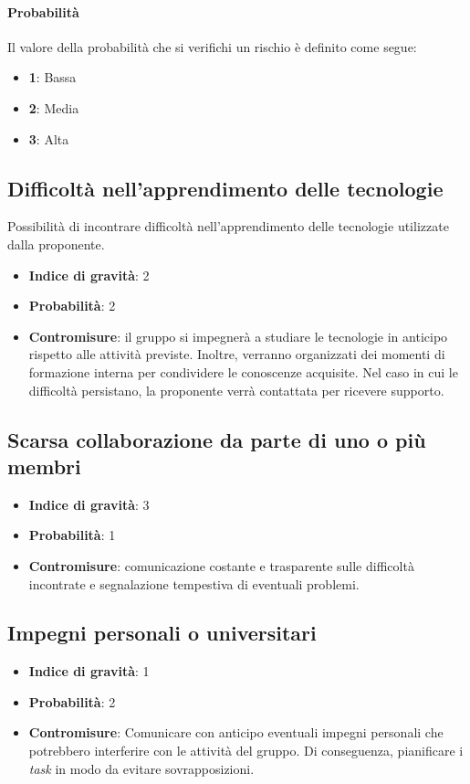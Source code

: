 \documentclass[italian,12pt]{article} %
\begin{document}
\paragraph{Probabilità} Il valore della probabilità che si verifichi un rischio è definito come segue:
\begin{itemize}
	\itemsep0em
	\item \textbf{1}: Bassa
	\item \textbf{2}: Media
	\item \textbf{3}: Alta
\end{itemize}

\subsection{Difficoltà nell'apprendimento delle tecnologie}
Possibilità di incontrare difficoltà nell'apprendimento delle tecnologie utilizzate dalla proponente.
\begin{itemize}
	\item \textbf{Indice di gravità}: 2
	\item \textbf{Probabilità}: 2
	\item \textbf{Contromisure}: il gruppo si impegnerà a studiare le tecnologie in anticipo rispetto alle attività previste.
	      Inoltre, verranno organizzati dei momenti di formazione interna per condividere le conoscenze acquisite.
	      Nel caso in cui le difficoltà persistano, la proponente verrà contattata per ricevere supporto.
\end{itemize}

\subsection{Scarsa collaborazione da parte di uno o più membri}
\begin{itemize}
	\item \textbf{Indice di gravità}: 3
	\item \textbf{Probabilità}: 1
	\item \textbf{Contromisure}: comunicazione costante e trasparente sulle
	      difficoltà incontrate e segnalazione tempestiva di eventuali problemi.
\end{itemize}

\subsection{Impegni personali o universitari}
\begin{itemize}
	\item \textbf{Indice di gravità}: 1
	\item \textbf{Probabilità}: 2
	\item \textbf{Contromisure}: Comunicare con anticipo eventuali impegni personali che potrebbero interferire con le attività del gruppo.
	      Di conseguenza, pianificare i \textit{task} in modo da evitare sovrapposizioni.
\end{itemize}
\end{document}

